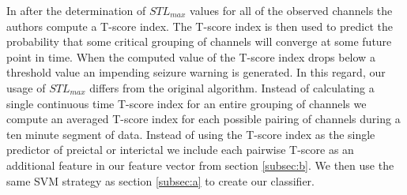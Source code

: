 In \cite{iasemidis05} after the determination of $STL_{max}$ values for all of the observed channels the authors compute a T-score index.  The T-score index is then used to predict the probability that some critical grouping of channels will converge at some future point in time.  When the computed value of the T-score index drops below a threshold value an impending seizure warning is generated.  In this regard, our usage of $STL_{max}$ differs from the original algorithm.  Instead of calculating a single continuous time T-score index for an entire grouping of channels we compute an averaged T-score index for each possible pairing of channels during a ten minute segment of data.  Instead of using the T-score index as the single predictor of preictal or interictal we include each pairwise T-score as an additional feature in our feature vector from section \ref{subsec:b}.  We then use the same SVM strategy as section \ref{subsec:a} to create our classifier.
